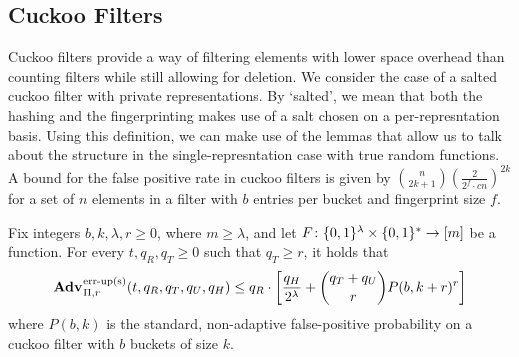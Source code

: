 \subsection{Cuckoo Filters}

Cuckoo filters provide a way of filtering elements with lower space overhead than counting filters while still allowing for deletion. We consider the case of a salted cuckoo filter with private representations. By `salted', we mean that both the hashing and the fingerprinting makes use of a salt chosen on a per-represntation basis. Using this definition, we can make use of the lemmas that allow us to talk about the structure in the single-represntation case with true random functions. A bound for the false positive rate in cuckoo filters is given by $\binom{n}{2k+1}\left(\frac{2}{2^f \cdot cn}\right)^{2k}$ for a set of $n$ elements in a filter with $b$ entries per bucket and fingerprint size $f$.

\begin{theorem}\label{thm:cuckoo-salt-bound}
Fix integers $b, k, \lambda, r\geq 0$, where $m \geq \lambda$, and let $F \colon \{0,1\}^\lambda \times \{0,1\}^* \to [m]$ be a function.
  For every $t, q_R, q_T \geq 0$ such that $q_T \geq r$, it holds that
  $$\Adv{\erreps}_{\struct,r}(t, q_R, q_T, q_U, q_H) \leq q_R \cdot
     \left[
      \frac{q_H}{2^\lambda} +
      {\dbinom{q_T+q_U}{r}} P(b,k+r)^r
    \right]$$
where $P(b,k)$ is the standard, non-adaptive false-positive probability on a cuckoo filter with $b$ buckets of size $k$.
\end{theorem}

